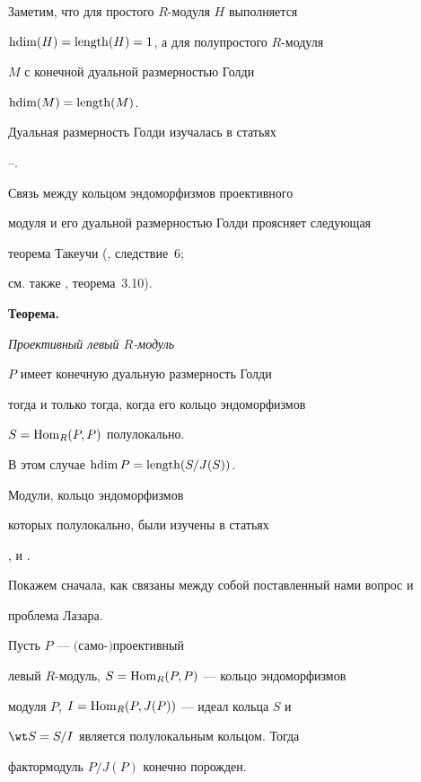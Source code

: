 Заметим, что для простого $R$-модуля $H$ выполняется


$\operatorname{hdim}(H)=\operatorname{length} (H)=1$, а для полупростого $R$-модуля 


$M$ с конечной дуальной размерностью Голди 


$\operatorname{hdim} (M)=\operatorname{length} (M)$. 


Дуальная размерность Голди изучалась в статьях 


\cite{sarath}--\cite{var1}. 


Связь между кольцом эндоморфизмов проективного 


модуля и его дуальной размерностью Голди проясняет следующая 


теорема Такеучи (\cite{takeuchi94}, следствие~6; 


см. также \cite{lomp99}, теорема~3.10). 


\medskip





{\bf Теорема.} 


{\em Проективный левый $R$-модуль 


$P$ имеет конечную дуальную размерность Голди 


тогда и только тогда, когда его кольцо эндоморфизмов


$S= \operatorname{Hom}_R (P,P)$ полулокально. 


В этом случае $ \operatorname{hdim} {P} = \operatorname{length} (S/J(S))$.}


\medskip





Модули, кольцо эндоморфизмов


которых полулокально, были изучены в статьях 


\cite{herbera}, \cite{lomp} и \cite{lomp99}. 





Покажем сначала, как связаны между собой поставленный нами вопрос и 


проблема Лазара. 





\begin{lems} 


Пусть $P$ --- $($само-$)$проективный


левый $R$-модуль, $S=\operatorname{Hom}_R(P,P)$ --- кольцо эндоморфизмов 


модуля $P$, $I=\operatorname{Hom}_R(P,J(P))$ --- идеал кольца $S$ и


$\wt S=S/I$ является полулокальным кольцом. Тогда 


фактормодуль $P/J(P)$ конечно порожден.


\end{lems}





